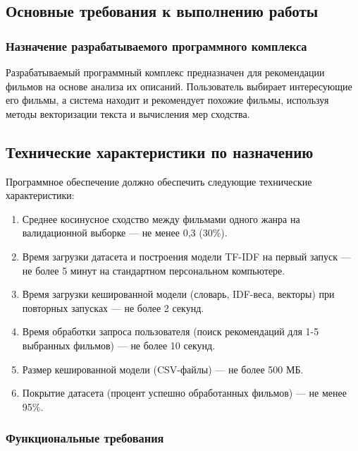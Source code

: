 \subsection{Основные требования к выполнению работы}

\subsubsection{Назначение разрабатываемого программного комплекса}

Разрабатываемый программный комплекс предназначен для рекомендации фильмов на основе анализа их описаний. Пользователь выбирает интересующие его фильмы, а система находит и рекомендует похожие фильмы, используя методы векторизации текста и вычисления мер сходства.

\subsection{Технические характеристики по назначению}

Программное обеспечение должно обеспечить следующие технические характеристики:

\begin{enumerate}
    \item Среднее косинусное сходство между фильмами одного жанра на валидационной выборке 
    — не менее 0,3 (30\%).
    
    \item Время загрузки датасета и построения модели TF-IDF на первый запуск — 
    не более 5 минут на стандартном персональном компьютере.
    
    \item Время загрузки кешированной модели (словарь, IDF-веса, векторы) при повторных запусках — 
    не более 2 секунд.
    
    \item Время обработки запроса пользователя (поиск рекомендаций для 1-5 выбранных фильмов) — 
    не более 10 секунд.
    
    \item Размер кешированной модели (CSV-файлы) — не более 500 МБ.
    
    \item Покрытие датасета (процент успешно обработанных фильмов) — не менее 95\%.
\end{enumerate}

\subsubsection{Функциональные требования}

